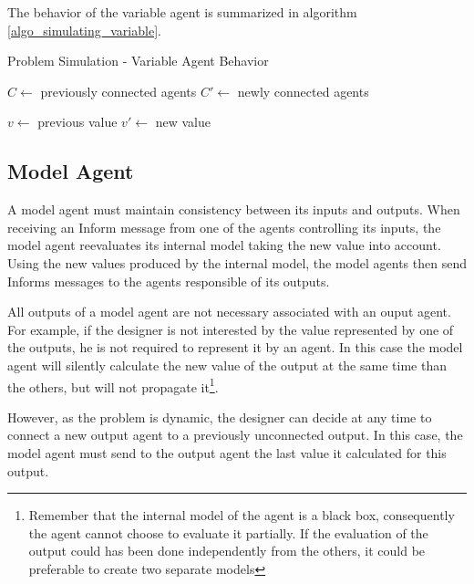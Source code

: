 The behavior of the variable agent is summarized in algorithm \ref{algo_simulating_variable}.

\begin{algorithm}
\caption{Problem Simulation - Variable Agent Behavior}
\label{algo_simulating_variable}

	$C \leftarrow$ previously connected agents\;
	$C'\leftarrow$  newly connected agents\;
		
	$v \leftarrow$ previous value\;
	$v'\leftarrow$ new value\;
	
	
	
\end{algorithm}

\subsection{Model Agent}\label{simulation_model}

A model agent must maintain consistency between its inputs and outputs. When receiving an Inform message from one of the agents controlling its inputs, the model agent reevaluates its internal model taking the new value into account. Using the new values produced by the internal model, the model agents then send Informs messages to the agents responsible of its outputs.

All outputs of a model agent are not necessary associated with an ouput agent. For example, if the designer is not interested by the value represented by one of the outputs, he is not required to represent it by an agent. In this case the model agent will silently calculate the new value of the output at the same time than the others, but will not propagate it\footnote{Remember that the internal model of the agent is a black box, consequently the agent cannot choose to evaluate it partially. If the evaluation of the output could has been done independently from the others, it could be preferable to create two separate models}.

However, as the problem is dynamic, the designer can decide at any time to connect a new output agent to a previously unconnected output. In this case, the model agent must send to the output agent the last value it calculated for this output.

